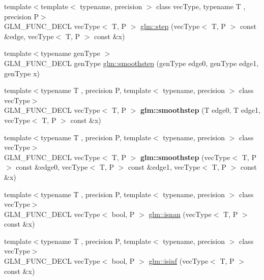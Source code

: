 \begin{DoxyCompactItemize}
\item 
{\footnotesize template$<$template$<$ typename, precision $>$ class vec\+Type, typename T , precision P$>$ }\\G\+L\+M\+\_\+\+F\+U\+N\+C\+\_\+\+D\+E\+CL vec\+Type$<$ T, P $>$ \hyperlink{group__core__func__common_ga6d84170051fb87c183c38883ec85b411}{glm\+::step} (vec\+Type$<$ T, P $>$ const \&edge, vec\+Type$<$ T, P $>$ const \&x)
\item 
{\footnotesize template$<$typename gen\+Type $>$ }\\G\+L\+M\+\_\+\+F\+U\+N\+C\+\_\+\+D\+E\+CL gen\+Type \hyperlink{group__core__func__common_ga562edf7eca082cc5b7a0aaf180436daf}{glm\+::smoothstep} (gen\+Type edge0, gen\+Type edge1, gen\+Type x)
\item 
\mbox{\label{group__core__func__common_gaeb3d9cf6e832b6d0000cd76e04cef682}} 
{\footnotesize template$<$typename T , precision P, template$<$ typename, precision $>$ class vec\+Type$>$ }\\G\+L\+M\+\_\+\+F\+U\+N\+C\+\_\+\+D\+E\+CL vec\+Type$<$ T, P $>$ {\bfseries glm\+::smoothstep} (T edge0, T edge1, vec\+Type$<$ T, P $>$ const \&x)
\item 
\mbox{\label{group__core__func__common_ga8b9b9ba3425d603118cf90aee8b32bd6}} 
{\footnotesize template$<$typename T , precision P, template$<$ typename, precision $>$ class vec\+Type$>$ }\\G\+L\+M\+\_\+\+F\+U\+N\+C\+\_\+\+D\+E\+CL vec\+Type$<$ T, P $>$ {\bfseries glm\+::smoothstep} (vec\+Type$<$ T, P $>$ const \&edge0, vec\+Type$<$ T, P $>$ const \&edge1, vec\+Type$<$ T, P $>$ const \&x)
\item 
{\footnotesize template$<$typename T , precision P, template$<$ typename, precision $>$ class vec\+Type$>$ }\\G\+L\+M\+\_\+\+F\+U\+N\+C\+\_\+\+D\+E\+CL vec\+Type$<$ bool, P $>$ \hyperlink{group__core__func__common_ga6cb8f202a52eed2331724a3800198ebf}{glm\+::isnan} (vec\+Type$<$ T, P $>$ const \&x)
\item 
{\footnotesize template$<$typename T , precision P, template$<$ typename, precision $>$ class vec\+Type$>$ }\\G\+L\+M\+\_\+\+F\+U\+N\+C\+\_\+\+D\+E\+CL vec\+Type$<$ bool, P $>$ \hyperlink{group__core__func__common_gaf28f7a4696746f081685c9fd05c7e2de}{glm\+::isinf} (vec\+Type$<$ T, P $>$ const \&x)
\item 

\end{DoxyCompactItemize}
